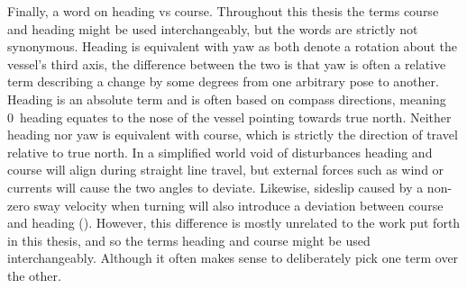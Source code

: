 Finally, a word on heading vs course. Throughout this thesis the terms course and heading might be used interchangeably, but the words are strictly not synonymous.
Heading is equivalent with yaw as both denote a rotation about the vessel's third axis, the difference between the two is that yaw is often a relative term describing
a change by some degrees from one arbitrary pose to another. Heading is an absolute term and is often based on compass directions, meaning 0\textdegree heading
equates to the nose of the vessel pointing towards true north. Neither heading nor yaw is equivalent with course, which is strictly the direction
of travel relative to true north. In a simplified world void of disturbances heading and course will align during straight line
travel, but external forces such as wind or currents will cause the two angles to deviate. Likewise, sideslip caused by a non-zero sway velocity when turning will 
also introduce a deviation between course and heading (\cite{fossen2011handbook}). However, this difference is mostly unrelated to the work put forth in this thesis, 
and so the terms heading and course might be used interchangeably. Although it often makes sense to deliberately pick one
term over the other.


